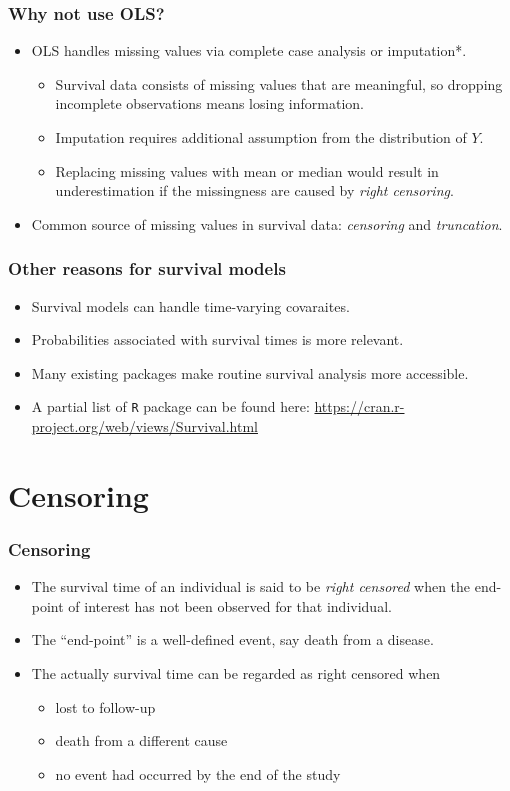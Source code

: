 \documentclass[10pt]{beamer}\usepackage[]{graphicx}\usepackage[]{color}
\newcommand{\empr}[1]{{\emph{\color{red}#1}}}
\newcommand{\R}{\texttt{R} }%
\begin{document}
\begin{frame}
  \frametitle{Why not use OLS?}
  \begin{itemize}
  \item OLS handles missing values via complete case analysis or imputation*.
    \begin{itemize}
    \item Survival data consists of missing values that are meaningful, 
      so dropping incomplete observations means losing information. 
    \item Imputation requires additional assumption from the distribution of $Y$.
    \item Replacing missing values with mean or median would result in 
      underestimation if the missingness are caused by \emph{right censoring}.
    \end{itemize}
  \item Common source of missing values in survival data: \emph{censoring} and \emph{truncation}.
  \end{itemize}
\end{frame}

\begin{frame}
  \frametitle{Other reasons for survival models}
  \begin{itemize}
  \item Survival models can handle time-varying covaraites.
  \item Probabilities associated with survival times is more relevant.
  \item Many existing packages make routine survival analysis more accessible.
  \item A partial list of \R package can be found here:
    \url{https://cran.r-project.org/web/views/Survival.html}
  \end{itemize}
\end{frame}

\section{Censoring}

\begin{frame}
  \frametitle{Censoring}
  \begin{itemize}
  \item The survival time of an individual is said to be \empr{right censored} when the end-point 
    of interest has not been observed for that individual. 
  \item The ``end-point'' is a well-defined event, say death from a disease.
  \item The actually survival time can be regarded as right censored when
    \begin{itemize}
    \item lost to follow-up
    \item death from a different cause
      \item no event had occurred by the end of the study 
    \end{itemize}
  \end{itemize}
\end{frame}
  
\end{document}
